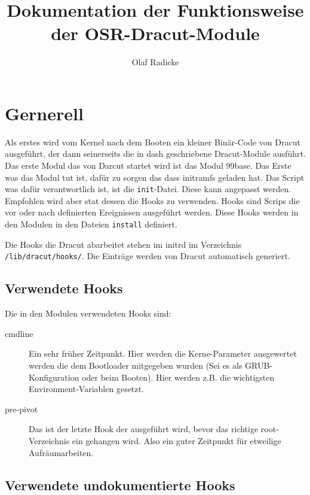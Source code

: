 \documentclass[10pt,a4paper]{article}
\author{Olaf Radicke}
\title{Dokumentation der Funktionsweise der OSR-Dracut-Module}
\begin{document}
\maketitle

\newpage 

\tableofcontents

\newpage 

\section{Gernerell}

Als erstes wird vom Kernel nach dem Booten ein kleiner Binär-Code von Dracut ausgeführt, der dann seinerseits die in dash geschriebene Dracut-Module ausführt. Das erste Modul das von Darcut startet wird ist das Modul 99base. Das Erste was das Modul tut ist, dafür zu sorgen das dass initramfs geladen hat. Das Script was dafür verantwortlich ist, ist die \texttt{init}-Datei. Diese kann angepasst werden. Empfohlen wird aber stat dessen die Hooks zu verwenden. Hooks sind Scrips die vor oder nach definierten Ereignissen ausgeführt werden. Diese Hooks werden in den Modulen in den Dateien \texttt{install} definiert.

Die Hooks die Dracut abarbeitet stehen im initrd im Verzeichnis \texttt{/lib/dracut/hooks/}. Die Einträge werden von Dracut automatisch generiert.

\subsection{Verwendete Hooks}

Die in den Modulen verwendeten Hooks sind:
\begin{description}
 \item[cmdline] Ein sehr früher Zeitpunkt. Hier werden die Kerne-Parameter ausgewertet werden die dem Bootloader mitgegeben wurden (Sei es als GRUB-Konfiguration oder beim Booten). Hier werden z.B. die wichtigsten Environment-Variablen gesetzt. 
 \item[pre-pivot] Das ist der letzte Hook der ausgeführt wird, bevor  das richtige root-Verzeichnis ein gehangen wird. Also ein guter Zeitpunkt für etweilige Aufräumarbeiten.
\end{description}
 
\subsection{Verwendete undokumentierte Hooks}
\end{document}
